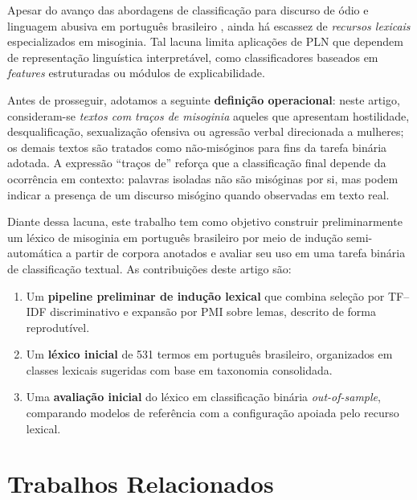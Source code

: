 \documentclass[12pt]{article}
\begin{document}
Apesar do avan\c{c}o das abordagens de classifica\c{c}\~ao para discurso
de \'odio e linguagem abusiva em portugu\^es brasileiro
\cite{vargas2022hatebr,leite2020toldbr}, ainda h\'a escassez de
\emph{recursos lexicais} especializados em misoginia. Tal lacuna limita
aplica\c{c}\~oes de PLN que dependem de representa\c{c}\~ao lingu\'istica
interpret\'avel, como classificadores baseados em \emph{features}
estruturadas ou m\'odulos de explicabilidade.

Antes de prosseguir, adotamos a seguinte \textbf{defini\c{c}\~ao
operacional}: neste artigo, consideram-se \emph{textos com tra\c{c}os de
misoginia} aqueles que apresentam hostilidade, desqualifica\c{c}\~ao,
sexualiza\c{c}\~ao ofensiva ou agress\~ao verbal direcionada a mulheres;
os demais textos s\~ao tratados como n\~ao-mis\'oginos para fins da tarefa
bin\'aria adotada. A express\~ao ``tra\c{c}os de'' refor\c{c}a que a
classifica\c{c}\~ao final depende da ocorr\^encia em contexto: palavras
isoladas n\~ao s\~ao mis\'oginas por si, mas podem indicar a presen\c{c}a
de um discurso mis\'ogino quando observadas em texto real.

Diante dessa lacuna, este trabalho tem como objetivo construir
preliminarmente um l\'exico de misoginia em portugu\^es brasileiro por
meio de indu\c{c}\~ao semi-autom\'atica a partir de corpora anotados e
avaliar seu uso em uma tarefa bin\'aria de classifica\c{c}\~ao textual.
As contribui\c{c}\~oes deste artigo s\~ao:

\begin{enumerate}[leftmargin=*,topsep=2pt,itemsep=2pt]
  \item Um \textbf{pipeline preliminar de indu\c{c}\~ao lexical} que
        combina sele\c{c}\~ao por TF--IDF discriminativo e expans\~ao por
        PMI sobre lemas, descrito de forma reprodut\'ivel.
  \item Um \textbf{l\'exico inicial} de 531 termos em portugu\^es
        brasileiro, organizados em classes lexicais sugeridas com base em
        taxonomia consolidada.
  \item Uma \textbf{avalia\c{c}\~ao inicial} do l\'exico em
        classifica\c{c}\~ao bin\'aria \emph{out-of-sample}, comparando
        modelos de refer\^encia com a configura\c{c}\~ao apoiada pelo
        recurso lexical.
\end{enumerate}

\section{Trabalhos Relacionados}
\end{document}
